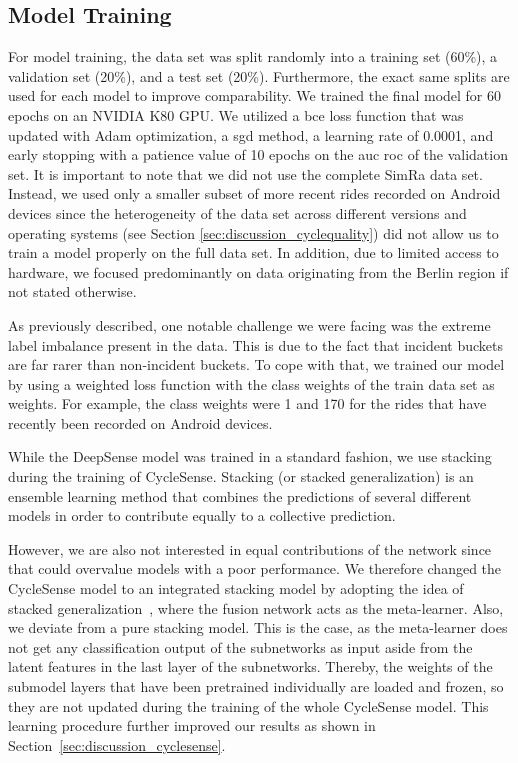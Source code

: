 \subsection{Model Training}
\label{subsec:model_training}
For model training, the data set was split randomly into a training set (60\%), a validation set (20\%), and a test set (20\%).
Furthermore, the exact same splits are used for each model to improve comparability.
We trained the final model for 60 epochs on an NVIDIA K80 GPU.
We utilized a \ac{bce} loss function that was updated with Adam optimization, a \ac{sgd} method, a learning rate of 0.0001, and early stopping with a patience value of 10 epochs on the \ac{auc} \ac{roc} of the validation set.
It is important to note that we did not use the complete SimRa data set.
Instead, we used only a smaller subset of more recent rides recorded on Android devices since the heterogeneity of the data set across different versions and operating systems (see Section \ref{sec:discussion_cyclequality}) did not allow us to train a model properly on the full data set.
In addition, due to limited access to hardware, we focused predominantly on data originating from the Berlin region if not stated otherwise.

As previously described, one notable challenge we were facing was the extreme label imbalance present in the data.
This is due to the fact that incident buckets are far rarer than non-incident buckets.
To cope with that, we trained our model by using a weighted loss function with the class weights of the train data set as weights.
For example, the class weights were 1 and 170 for the rides that have recently been recorded on Android devices.

While the DeepSense model was trained in a standard fashion, we use stacking during the training of CycleSense.
Stacking (or stacked generalization) is an ensemble learning method that combines the predictions of several different models in order to contribute equally to a collective prediction.

However, we are also not interested in equal contributions of the network since that could overvalue models with a poor performance.
We therefore changed the CycleSense model to an integrated stacking model by adopting the idea of stacked generalization~\cite{wolpert1992stacked}, where the fusion network acts as the meta-learner.
Also, we deviate from a pure stacking model.
This is the case, as the meta-learner does not get any classification output of the subnetworks as input aside from the latent features in the last layer of the subnetworks.
Thereby, the weights of the submodel layers that have been pretrained individually are loaded and frozen, so they are not updated during the training of the whole CycleSense model.
This learning procedure further improved our results as shown in Section~\ref{sec:discussion_cyclesense}.

